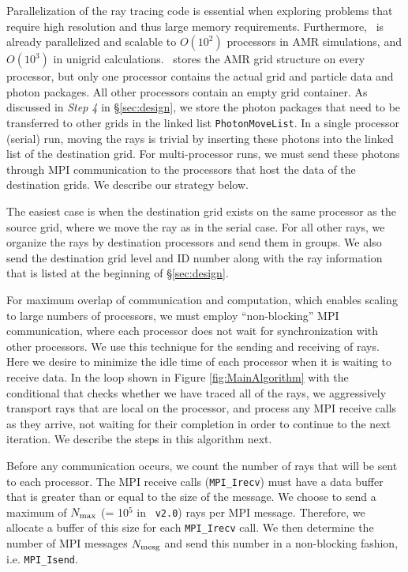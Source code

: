 \documentclass[useAMS,usenatbib,a4paper]{mn2e}
\begin{document}
Parallelization of the ray tracing code is essential when exploring
problems that require high resolution and thus large memory
requirements.  Furthermore, \enzo~is already parallelized and scalable
to $O(10^2)$ processors in AMR simulations, and $O(10^3)$ in unigrid
calculations.  \enzo~stores the AMR grid structure on every processor,
but only one processor contains the actual grid and particle data and
photon packages.  All other processors contain an empty grid
container.  As discussed in \textit{Step 4} in \S\ref{sec:design}, we
store the photon packages that need to be transferred to other grids
in the linked list \texttt{PhotonMoveList}.  In a single processor
(serial) run, moving the rays is trivial by inserting these photons
into the linked list of the destination grid.  For multi-processor
runs, we must send these photons through MPI communication to the
processors that host the data of the destination grids.  We describe
our strategy below.

The easiest case is when the destination grid exists on the same
processor as the source grid, where we move the ray as in the serial
case.  For all other rays, we organize the rays by destination
processors and send them in groups.  We also send the destination grid
level and ID number along with the ray information that is listed at
the beginning of \S\ref{sec:design}.

For maximum overlap of communication and computation, which enables
scaling to large numbers of processors, we must employ
``non-blocking'' MPI communication, where each processor does not wait
for synchronization with other processors.  We use this technique for
the sending and receiving of rays.  Here we desire to minimize the
idle time of each processor when it is waiting to receive data.  In
the loop shown in Figure \ref{fig:MainAlgorithm} with the conditional
that checks whether we have traced all of the rays, we aggressively
transport rays that are local on the processor, and process any MPI
receive calls as they arrive, not waiting for their completion in
order to continue to the next iteration.  We describe the steps in
this algorithm next.

 Before any communication occurs, we count the number of rays
that will be sent to each processor.  The MPI receive calls
(\texttt{MPI\_Irecv}) must have a data buffer that is greater than or
equal to the size of the message.  We choose to send a maximum of
$N_{\rm max}$ (= 10$^5$ in \enzo~\texttt{v2.0}) rays per MPI message.
Therefore, we allocate a buffer of this size for each
\texttt{MPI\_Irecv} call.  We then determine the number of MPI messages
$N_{\rm mesg}$ and send this number in a non-blocking fashion,
i.e. \texttt{MPI\_Isend}.
\end{document}
